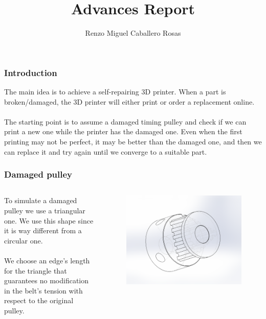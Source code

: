 \documentclass[aspectratio=169]{beamer}\usepackage[utf8]{inputenc}
\title{Advances Report}
\subtitle{Renzo Miguel Caballero Rosas}
\begin{document}
\begin{frame}
\titlepage
\end{frame}

\begin{frame}\frametitle{Introduction}

The main idea is to achieve a self-repairing 3D printer. When a part is broken/damaged, the 3D printer will either print or order a replacement online.\\
\quad\\
The starting point is to assume a damaged timing pulley and check if we can print a new one while the printer has the damaged one. Even when the first printing may not be perfect, it may be better than the damaged one, and then we can replace it and try again until we converge to a suitable part.

\end{frame}


\begin{frame}\frametitle{Damaged pulley}



\begin{columns}[c]

To simulate a damaged pulley we use a triangular one. We use this shape since it is way different from a circular one.\\
\quad\\
We choose an edge's length for the triangle that guarantees no modification in the belt's tension with respect to the original pulley.

\begin{figure}[ht!]
\centering
\includegraphics[width=1\textwidth]{figures/pulley_tri_small.PDF}
\end{figure}

\end{columns}

\end{frame}
\end{document}
